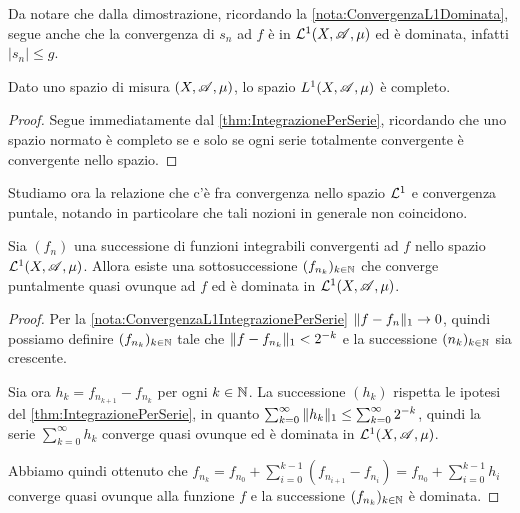 \begin{remark}\label{nota:ConvergenzaL1IntegrazionePerSerie}
	Da notare che dalla dimostrazione, ricordando la \cref{nota:ConvergenzaL1Dominata}, segue anche che la convergenza di $s_n$ ad $f$ è in $\mathcal L^1(X,\mathscr A,\mu)$ ed è dominata, infatti $|s_n|\le g$.
\end{remark}


\begin{corollary}
	Dato uno spazio di misura $(X,\mathscr A,\mu)$, lo spazio $L^1(X,\mathscr A,\mu)$ è completo.
\end{corollary}

\begin{proof}
	Segue immediatamente dal \cref{thm:IntegrazionePerSerie}, ricordando che uno spazio normato è completo se e solo se ogni serie totalmente convergente è convergente nello spazio.
\end{proof}

Studiamo ora la relazione che c'è fra convergenza nello spazio $\mathcal L^1$ e convergenza puntale, notando in particolare che tali nozioni in generale non coincidono.

\begin{proposition}\label{prop:L1ImplicaSottosuccessioneQuasiOvunque}
	Sia $(f_n)$ una successione di funzioni integrabili convergenti ad $f$ nello spazio $\mathcal L^1(X,\mathscr A,\mu)$. Allora esiste una sottosuccessione $(f_{n_k})_{k\in\mathbb N}$ che converge puntalmente quasi ovunque ad $f$ ed è dominata in $\mathcal L^1(X,\mathscr A,\mu)$.
\end{proposition}

\begin{proof}
	Per la \cref{nota:ConvergenzaL1IntegrazionePerSerie} $\Vert f-f_n\Vert_1\to 0$, quindi possiamo definire $(f_{n_k})_{k\in\mathbb N}$ tale che $\Vert f-f_{n_k}\Vert_1<2^{-k}$ e la successione $(n_k)_{k\in\mathbb N}$ sia crescente.
	
	Sia ora $h_k=f_{n_{k+1}}-f_{n_k}$ per ogni $k\in\mathbb N$. La successione $(h_k)$ rispetta le ipotesi del \cref{thm:IntegrazionePerSerie}, in quanto $\sum_{k=0}^\infty \Vert h_k\Vert_1\le \sum_{k=0}^\infty 2^{-k}$, quindi la serie $\sum_{k=0}^\infty h_k$ converge quasi ovunque ed è dominata in $\mathcal L^1(X,\mathscr A,\mu)$.
	
	Abbiamo quindi ottenuto che $f_{n_k}=f_{n_0}+\sum_{i=0}^{k-1}(f_{n_{i+1}}-f_{n_i})=f_{n_0}+\sum_{i=0}^{k-1} h_i$ converge quasi ovunque alla funzione $f$ e la successione $(f_{n_k})_{k\in\mathbb N}$ è dominata.
\end{proof}

